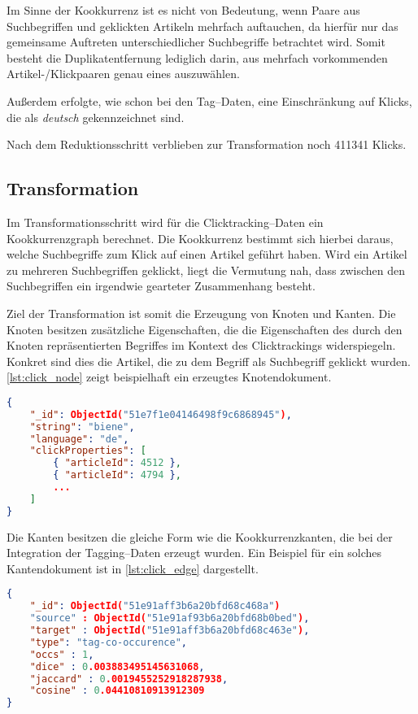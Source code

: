 Im Sinne der Kookkurrenz ist es nicht von Bedeutung, wenn Paare aus Suchbegriffen und geklickten Artikeln mehrfach auftauchen, da hierfür nur das gemeinsame Auftreten unterschiedlicher Suchbegriffe betrachtet wird. Somit besteht die Duplikatentfernung lediglich darin, aus mehrfach vorkommenden Artikel-/Klickpaaren genau eines auszuwählen.

Außerdem erfolgte, wie schon bei den Tag--Daten, eine Einschränkung auf Klicks, die als \emph{deutsch} gekennzeichnet sind.

Nach dem Reduktionsschritt verblieben zur Transformation noch \num{411341} Klicks.

\subsection{Transformation}

Im Transformationsschritt wird für die Clicktracking--Daten ein Kookkurrenzgraph berechnet. Die Kookkurrenz bestimmt sich hierbei daraus, welche Suchbegriffe zum Klick auf einen Artikel geführt haben. Wird ein Artikel zu mehreren Suchbegriffen geklickt, liegt die Vermutung nah, dass zwischen den Suchbegriffen ein irgendwie gearteter Zusammenhang besteht.

Ziel der Transformation ist somit die Erzeugung von Knoten und Kanten. Die Knoten besitzen zusätzliche Eigenschaften, die die Eigenschaften des durch den Knoten repräsentierten Begriffes im Kontext des Clicktrackings widerspiegeln. Konkret sind dies die Artikel, die zu dem Begriff als Suchbegriff geklickt wurden. \cref{lst:click_node} zeigt beispielhaft ein erzeugtes Knotendokument.

\begin{lstlisting}[language=json, label={lst:click_node}, caption={Knotendokument mit Clicktracking--Eigenschaften}]
{
    "_id": ObjectId("51e7f1e04146498f9c6868945"),
    "string": "biene",
    "language": "de",
    "clickProperties": [
        { "articleId": 4512 },
        { "articleId": 4794 },
        ...
    ]
}
\end{lstlisting}

Die Kanten besitzen die gleiche Form wie die Kookkurrenzkanten, die bei der Integration der Tagging--Daten erzeugt wurden. Ein Beispiel für ein solches Kantendokument ist in \cref{lst:click_edge} dargestellt.

\begin{lstlisting}[language=json, label={lst:click_edge}, caption={Clicktracking--Kookkurrenzkante}]
{
    "_id": ObjectId("51e91aff3b6a20bfd68c468a")
    "source" : ObjectId("51e91af93b6a20bfd68b0bed"),
    "target" : ObjectId("51e91aff3b6a20bfd68c463e"),
    "type": "tag-co-occurence",
    "occs" : 1,
    "dice" : 0.003883495145631068,
    "jaccard" : 0.0019455252918287938,
    "cosine" : 0.04410810913912309
}
\end{lstlisting}

